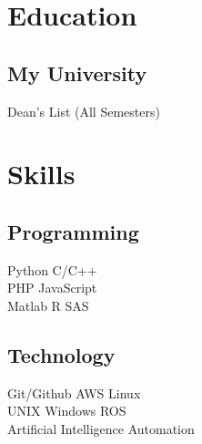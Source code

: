 \documentclass[]{deedy-resume-reversed}
\begin{document}
\begin{minipage}[t]{0.60\textwidth}

% 
% 

%
%

\end{minipage}
\hfill
\begin{minipage}[t]{0.33\textwidth}


\section{Education}

\subsection{My University}
Dean's List (All Semesters) \\
\sectionsep


\section{Skills}
\subsection{Programming}
Python \textbullet{} C/C++ \\
PHP \textbullet{} JavaScript \\
Matlab \textbullet{} R \textbullet{} SAS \\
\sectionsep

\subsection{Technology}
Git/Github \textbullet{} AWS \textbullet{} Linux \\
UNIX \textbullet{} Windows \textbullet{} ROS \\
Artificial Intelligence \textbullet{} Automation \\
\sectionsep


\end{minipage}
\end{document}

